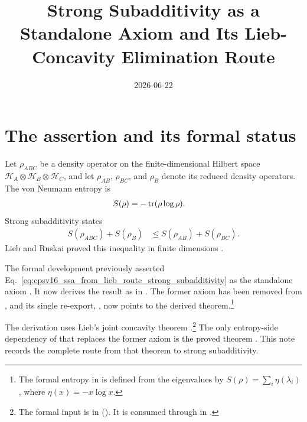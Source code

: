 \documentclass[11pt]{article}
\title{Strong Subadditivity as a Standalone Axiom and Its Lieb-Concavity
Elimination Route}
\author{}
\date{2026-06-22}
\begin{document}
\maketitle
{}

\section{The assertion and its formal status}

Let $\rho_{ABC}$ be a density operator on the finite-dimensional Hilbert space
$\mathcal H_A\otimes\mathcal H_B\otimes\mathcal H_C$, and let
$\rho_{AB}$, $\rho_{BC}$, and $\rho_B$ denote its reduced density operators.
The von Neumann entropy is
\begin{align}
    S(\rho)
        &= -\operatorname{tr}(\rho\log\rho).
    \label{eq:cpsv16_ssa_from_lieb_route_entropy_definition}
\end{align}
Strong subadditivity states
\begin{align}
    S(\rho_{ABC})+S(\rho_B)
        &\leq S(\rho_{AB})+S(\rho_{BC}).
    \label{eq:cpsv16_ssa_from_lieb_route_strong_subadditivity}
\end{align}
Lieb and Ruskai proved this inequality in finite dimensions
\cite{LiebRuskai1973}.

The formal development previously asserted
Eq.~\ref{eq:cpsv16_ssa_from_lieb_route_strong_subadditivity} as the standalone
axiom . It now derives the result as
 in
. The former axiom has
been removed from , and its
single re-export, , now points to the
derived theorem.\footnote{The formal entropy in
 is defined from the eigenvalues by
$S(\rho)=\sum_i\eta(\lambda_i)$, where $\eta(x)=-x\log x$.}

The derivation uses Lieb's joint concavity theorem
\cite{Lieb1973Convex}.\footnote{The formal input is
 in
(). It is consumed through
 in
.}
The only entropy-side dependency of
 that replaces the former axiom is the
proved theorem . This note records the complete
route from that theorem to strong subadditivity.
\end{document}
